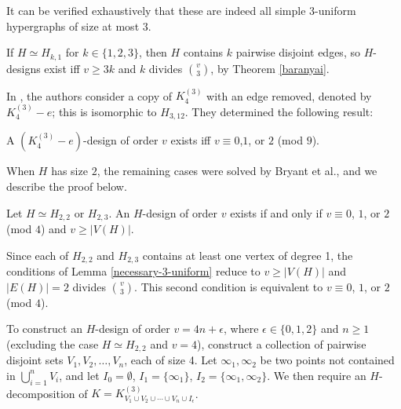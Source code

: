 It can be verified exhaustively that these are indeed all simple $3$-uniform hypergraphs of size at most 3.

If $H \simeq H_{k,1}$ for $k \in \{1, 2, 3\}$, then $H$ contains $k$ pairwise disjoint edges, so $H$-designs exist iff $v \geq 3k$ and $k$ divides ${v \choose 3}$, by Theorem \ref{baranyai}.

In \cite{feng-chang2}, the authors consider a copy of $K_4^{(3)}$ with an edge removed, denoted by $K_4^{(3)} - e$; this is isomorphic to $H_{3,12}$. They determined the following result:

\begin{theorem} \label{thm:H_3,12}
A $(K_4^{(3)}-e)$-design of order $v$ exists iff $v \equiv 0$,$1$, or $2$ (mod $9$).
\end{theorem}

When $H$ has size $2$, the remaining cases were solved by Bryant et al., and we describe the proof below.

\begin{theorem} \label{thm:H_22,H_23}
Let $H \simeq H_{2,2}$ or $H_{2,3}$.
An $H$-design of order $v$ exists if and only if $v \equiv 0$, $1$, or $2$ (mod $4$) and $v \geq |V(H)|$.
\end{theorem}

Since each of $H_{2,2}$ and $H_{2,3}$ contains at least one vertex of degree 1, the conditions of Lemma \ref{necessary-3-uniform}
reduce to $v \geq |V(H)|$ and $|E(H)| = 2$ divides ${v \choose 3}$. This second condition is equivalent to $v \equiv 0$, $1$, or $2$ (mod $4$).

To construct an $H$-design of order $v = 4n + \epsilon$, where $\epsilon \in \{0,1,2\}$ and $n \geq 1$
(excluding the case $H \simeq H_{2,2}$ and $v = 4$), construct a collection of pairwise disjoint sets
$V_1, V_2, \ldots, V_n$, each of size 4. Let $\infty_1, \infty_2$ be two points not contained in
$\bigcup_{i=1}^{n} V_i$, and let $I_0 = \emptyset$, $I_1 = \{\infty_1\}$, $I_2 = \{\infty_1, \infty_2\}$.
We then require an $H$-decomposition of $K = K_{V_1 \cup V_2 \cup \cdots \cup V_n \cup I_\epsilon}^{(3)}$.

